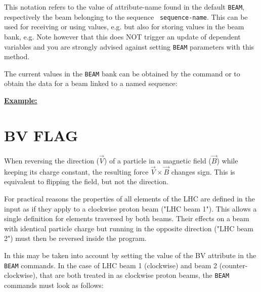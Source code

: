 This notation refers to the value of attribute-name found in the default
{\tt BEAM}, respectively the beam belonging to the sequence {\tt 
sequence-name}. 
This can be used for receiving or using values, e.g. 
but also for storing values in the beam bank, e.g.  
Note however that this does NOT trigger an update of dependent variables
and you are strongly advised against setting {\tt BEAM} parameters with this 
method.

The current values in the {\tt BEAM} bank can be obtained by the command
or to obtain the data for a beam linked to a named sequence:


{\bf \underline{Example:}} 





\section{BV FLAG}
\label{sec:bvflag}
When reversing the direction ($\vec V$) of a particle in a magnetic field
($\vec B$) while keeping its charge constant, the resulting force $\vec
V \times \vec B$ changes sign. This is equivalent to flipping the field,
but not the direction.  

For practical reasons the properties of all elements of the LHC are
defined in the \madx input as if they apply to a clockwise proton beam
("LHC beam 1"). This allows a single definition for elements traversed
by both beams. Their effects on a beam with identical particle charge
but running in the opposite direction ("LHC beam 2") must then be
reversed inside the program.  

In \madx this may be taken into account by setting the value of
the BV attribute in the {\tt BEAM} commands. In the case of LHC beam 1
(clockwise) and beam 2 (counter-clockwise), that are both treated in
\madx as clockwise proton beams, the {\tt BEAM} commands must look as follows:  





